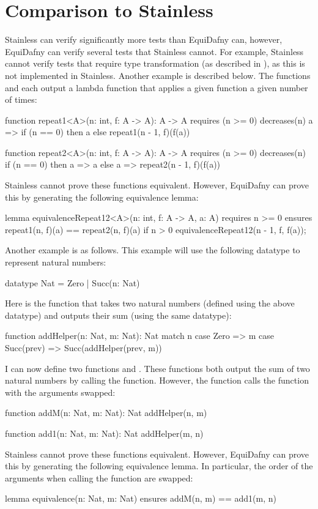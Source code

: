\section{Comparison to Stainless}

Stainless can verify significantly more tests than EquiDafny can, however, EquiDafny can verify several tests that Stainless cannot. For example, Stainless cannot verify tests that require type transformation (as described in ), as this is not implemented in Stainless. Another example is described below. The functions  and  each output a lambda function that applies a given function a given number of times:
\begin{dafny}
function repeat1<A>(n: int, f: A -> A): A -> A
  requires (n >= 0)
  decreases(n) {
  a =>
    if (n == 0) then a
    else repeat1(n - 1, f)(f(a))
}

function repeat2<A>(n: int, f: A -> A): A -> A
  requires (n >= 0)
  decreases(n) {
  if (n == 0) then a => a
  else a => repeat2(n - 1, f)(f(a))
}
\end{dafny}
%
Stainless cannot prove these functions equivalent. However, EquiDafny can prove this by generating the following equivalence lemma:
\begin{dafny}
lemma equivalenceRepeat12<A>(n: int, f: A -> A, a: A)
  requires n >= 0
  ensures repeat1(n, f)(a) == repeat2(n, f)(a)
{
  if n > 0 {
    equivalenceRepeat12(n - 1, f, f(a));
  }
}
\end{dafny}
%

Another example is as follows. This example will use the following datatype to represent natural numbers:
\begin{dafny}
datatype Nat = Zero | Succ(n: Nat)
\end{dafny}
%
Here is the function  that takes two natural numbers (defined using the above datatype) and outputs their sum (using the same datatype):
\begin{dafny}
function addHelper(n: Nat, m: Nat): Nat {
    match n {
        case Zero => m
        case Succ(prev) => Succ(addHelper(prev, m))
    }
}
\end{dafny}
%
I can now define two functions  and . These functions both output the sum of two natural numbers by calling the  function. However, the  function calls the  function with the arguments swapped:
\begin{dafny}
function addM(n: Nat, m: Nat): Nat {
    addHelper(n, m)
}

function add1(n: Nat, m: Nat): Nat {
    addHelper(m, n)
}
\end{dafny}
%
Stainless cannot prove these functions equivalent. However, EquiDafny can prove this by generating the following equivalence lemma. In particular, the order of the arguments when calling the  function are swapped:
\begin{dafny}
lemma equivalence(n: Nat, m: Nat)
    ensures addM(n, m) == add1(m, n)
{}
\end{dafny}
%

